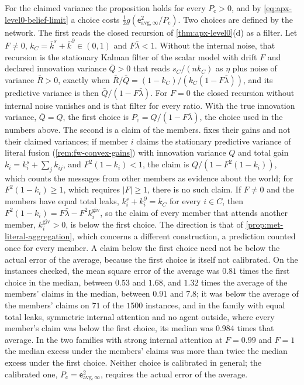 \begin{remark}
For the claimed variance the proposition holds for every $P_{\mathrm c}>0$, and by \eqref{eq:apx-level0-belief-limit} a choice costs $\frac12g(\mathsf e_{\mathrm{avg},\infty}^2/P_{\mathrm c})$. Two choices are defined by the network. The first reads the closed recursion of \cref{thm:apx-level0}(d) as a filter. Let $F\ne0$, $k_C=\bar k^s+\bar k^\partial\in(0,1)$ and $F\bar\lambda<1$. Without the internal noise, that recursion is the stationary Kalman filter of the scalar model with drift $F$ and declared innovation variance $\bar Q>0$ that reads $s_C/(nk_C)$ as $\eta$ plus noise of variance $\bar R>0$, exactly when $\bar R/\bar Q=(1-k_C)/(k_C(1-F\bar\lambda))$, and its predictive variance is then $\bar Q/(1-F\bar\lambda)$. For $F=0$ the closed recursion without internal noise vanishes and is that filter for every ratio. With the true innovation variance, $\bar Q=Q$, the first choice is $P_{\mathrm c}=Q/(1-F\bar\lambda)$, the choice used in the numbers above. The second is a claim of the members.  fixes their gains and not their claimed variances; if member $i$ claims the stationary predictive variance of literal fusion (\cref{rem:fw-convex-gains}) with innovation variance $Q$ and total gain $k_i=k^s_i+\sum_jk_{ij}$, and $F^2(1-k_i)<1$, the claim is $Q/(1-F^2(1-k_i))$, which counts the messages from other members as evidence about the world; for $F^2(1-k_i)\ge1$, which requires $\lvert F\rvert\ge1$, there is no such claim. If $F\ne0$ and the members have equal total leaks, $k^s_i+k^\partial_i=k_C$ for every $i\in C$, then $F^2(1-k_i)=F\bar\lambda-F^2k^{\mathrm{giv}}_i$, so the claim of every member that attends another member, $k^{\mathrm{giv}}_i>0$, is below the first choice. The direction is that of \cref{prop:met-literal-aggregation}, which concerns a different construction, a prediction counted once for every member. A claim below the first choice need not be below the actual error of the average, because the first choice is itself not calibrated. On the instances checked, the mean square error of the average was $0.81$ times the first choice in the median, between $0.53$ and $1.68$, and $1.32$ times the average of the members' claims in the median, between $0.91$ and $7.8$; it was below the average of the members' claims on $71$ of the $1500$ instances, and in the family with equal total leaks, symmetric internal attention and no agent outside, where every member's claim was below the first choice, its median was $0.984$ times that average. In the two families with strong internal attention at $F=0.99$ and $F=1$ the median excess under the members' claims was more than twice the median excess under the first choice. Neither choice is calibrated in general; the calibrated one, $P_{\mathrm c}=\mathsf e_{\mathrm{avg},\infty}^2$, requires the actual error of the average.
\end{remark}

